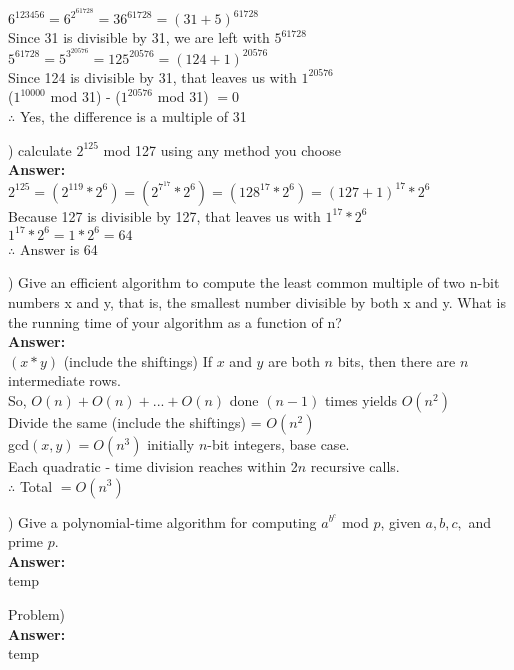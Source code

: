 \documentclass{article}
\begin{document}
\indent $6^{123456} = 6^{2^61728} = 36^{61728} = (31 + 5)^{61728}$ \\
\indent Since 31 is divisible by 31, we are left with $5^{61728}$ \\
\indent $5^{61728} = 5^{3^{20576}} = 125^{20576} = (124 + 1)^{20576}$ \\
\indent Since 124 is divisible by 31, that leaves us with $1^{20576}$ \\

\indent ($1^{10000}$ mod 31) - ($1^{20576}$ mod 31) $= 0$ \\
\indent $\therefore$ Yes, the difference is a multiple of 31

\vspace{.3in}
) calculate $2^{125}$ mod 127 using any method you choose \\
\vspace{.1in}
{\bf Answer:} \\
\indent $2^{125} = (2^{119}* 2^6) = (2^{7^{17}}* 2^6) = (128^{17}* 2^6) = (127 + 1)^{17}*2^6$ \\
\indent Because 127 is divisible by 127, that leaves us with $1^{17}*2^6$ \\
\indent $1^{17}*2^6 = 1 * 2^6 = 64$ \\
\indent $\therefore$ Answer is 64

\vspace{.3in}
) Give an efficient algorithm to compute the least common multiple of two 
\indent n-bit numbers x and y, that is, the smallest number divisible by both x and 
\indent y. What is the running time of your algorithm as a function of n? \\
\vspace{.1in}
{\bf Answer:} \\
\indent $(x * y)$ (include the shiftings) If $x$ and $y$ are both $n$ bits, then there are $n$ \\
\indent intermediate rows. \\
\indent So, $O(n) + O(n) + . . . +O(n)$ done $(n - 1)$ times yields $O(n^2)$ \\
\indent Divide the same (include the shiftings) = $O(n^2)$ \\

\indent gcd$(x, y) = O(n^3)$ initially $n$-bit integers, base case. \\
\indent Each quadratic - time division reaches within 2$n$ recursive calls. \\
\indent $\therefore$ Total $= O(n^3)$

\vspace{.3in}
) Give a polynomial-time algorithm for computing $a^{b^c}$ mod $p$, given $a, b, c,$ 
\indent and prime $p$. \\
\vspace{.1in}
{\bf Answer:} \\
\indent temp

\vspace{.3in}
\noindent Problem) \\
\vspace{.1in}
{\bf Answer:} \\
\indent temp
\end{document}
